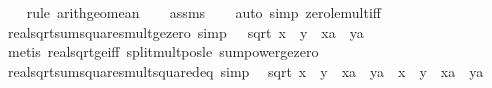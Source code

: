 \begin{isabellebody}
%
\isadelimproof
\ \ %
\endisadelimproof
%
\isatagproof
{}\isamarkupfalse%
\ {\isacharparenleft}{\kern0pt}rule\ arith{\isacharunderscore}{\kern0pt}geo{\isacharunderscore}{\kern0pt}mean{\isacharparenright}{\kern0pt}\isanewline
\ \ \isamarkupfalse%
\ assms\isanewline
\ \ \isamarkupfalse%
\ {\isacharparenleft}{\kern0pt}auto\ simp{\isacharcolon}{\kern0pt}\ zero{\isacharunderscore}{\kern0pt}le{\isacharunderscore}{\kern0pt}mult{\isacharunderscore}{\kern0pt}iff{\isacharparenright}{\kern0pt}\isanewline
\ \ \isamarkupfalse%
%
\endisatagproof
{\isafoldproof}%
%
\isadelimproof
\isanewline
%
\endisadelimproof
\isanewline
{}\isamarkupfalse%
\ real{\isacharunderscore}{\kern0pt}sqrt{\isacharunderscore}{\kern0pt}sum{\isacharunderscore}{\kern0pt}squares{\isacharunderscore}{\kern0pt}mult{\isacharunderscore}{\kern0pt}ge{\isacharunderscore}{\kern0pt}zero\ {\isacharbrackleft}{\kern0pt}simp{\isacharbrackright}{\kern0pt}{\isacharcolon}{\kern0pt}\ {\isachardoublequoteopen}{}\ {\isasymle}\ sqrt\ {\isacharparenleft}{\kern0pt}{\isacharparenleft}{\kern0pt}x\ {\isacharplus}{\kern0pt}\ y\ {\isacharasterisk}{\kern0pt}\ {\isacharparenleft}{\kern0pt}xa\ {\isacharplus}{\kern0pt}\ ya\isanewline
%
\isadelimproof
\ \ %
\endisadelimproof
%
\isatagproof
{}\isamarkupfalse%
\ {\isacharparenleft}{\kern0pt}metis\ real{\isacharunderscore}{\kern0pt}sqrt{\isacharunderscore}{\kern0pt}ge{\isacharunderscore}{\kern0pt}{}{\isacharunderscore}{\kern0pt}iff\ split{\isacharunderscore}{\kern0pt}mult{\isacharunderscore}{\kern0pt}pos{\isacharunderscore}{\kern0pt}le\ sum{\isacharunderscore}{\kern0pt}power{}{\isacharunderscore}{\kern0pt}ge{\isacharunderscore}{\kern0pt}zero{\isacharparenright}{\kern0pt}%
\endisatagproof
{\isafoldproof}%
%
\isadelimproof
\isanewline
%
\endisadelimproof
\isanewline
{}\isamarkupfalse%
\ real{\isacharunderscore}{\kern0pt}sqrt{\isacharunderscore}{\kern0pt}sum{\isacharunderscore}{\kern0pt}squares{\isacharunderscore}{\kern0pt}mult{\isacharunderscore}{\kern0pt}squared{\isacharunderscore}{\kern0pt}eq\ {\isacharbrackleft}{\kern0pt}simp{\isacharbrackright}{\kern0pt}{\isacharcolon}{\kern0pt}\isanewline
\ \ {\isachardoublequoteopen}{\isacharparenleft}{\kern0pt}sqrt\ {\isacharparenleft}{\kern0pt}{\isacharparenleft}{\kern0pt}x\ {\isacharplus}{\kern0pt}\ y\ {\isacharasterisk}{\kern0pt}\ {\isacharparenleft}{\kern0pt}xa\ {\isacharplus}{\kern0pt}\ ya\ {\isacharequal}{\kern0pt}\ {\isacharparenleft}{\kern0pt}x\ {\isacharplus}{\kern0pt}\ y\ {\isacharasterisk}{\kern0pt}\ {\isacharparenleft}{\kern0pt}xa\ {\isacharplus}{\kern0pt}\ ya\isanewline

\end{isabellebody}
